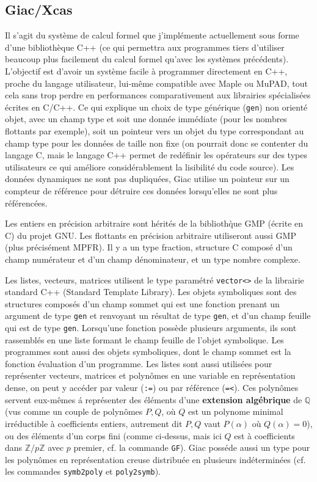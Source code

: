 \documentclass[a4paper,11pt]{book}
\begin{document}
\begin{giacjshere}
\subsection{Giac/Xcas}
Il s'agit du système de calcul formel que j'implémente actuellement sous 
forme d'une biblioth\`eque C++ (ce qui
permettra aux programmes tiers d'utiliser beaucoup plus facilement du 
calcul formel qu'avec les syst\`emes pr\'ec\'edents). L'objectif est 
d'avoir un syst\`eme facile \`a programmer directement en C++, proche 
du langage utilisateur, lui-m\^eme compatible avec Maple ou MuPAD, 
tout cela sans trop perdre en performances comparativement aux
librairies sp\'ecialis\'ees \'ecrites en C/C++. Ce qui explique un choix 
de type g\'en\'erique (\verb=gen=) non orient\'e objet, avec un champ type 
et soit une donn\'ee imm\'ediate (pour les nombres flottants par exemple), 
soit un pointeur vers un objet du type correspondant au champ type pour 
les donn\'ees de taille non fixe (on pourrait donc se
contenter du langage C, mais le langage C++ permet de red\'efinir 
les op\'erateurs sur des types utilisateurs ce qui
am\'eliore consid\'erablement la lisibilit\'e du code source). 
Les donn\'ees dynamiques ne sont pas dupliqu\'ees, Giac
utilise un pointeur sur un compteur de r\'ef\'erence pour d\'etruire 
ces donn\'ees lorsqu'elles ne sont plus r\'ef\'erenc\'ees.

Les entiers en pr\'ecision arbitraire sont h\'erit\'es de la biblioth\`que
GMP (\'ecrite en C) du projet GNU. Les flottants en pr\'ecision arbitraire
utiliseront aussi GMP (plus précisément MPFR).
Il y a un type fraction, structure C compos\'e d'un champ num\'erateur
et d'un champ d\'enominateur, et un type nombre complexe.

Les listes, vecteurs, matrices utilisent le type paramétré \verb|vector<>|
de la librairie standard C++ (Standard Template Library).
Les objets symboliques sont des structures compos\'es d'un champ sommet
qui est une fonction prenant un argument de type \verb|gen|
et renvoyant un r\'esultat
de type \verb|gen|, et d'un champ feuille qui est de type \verb|gen|.
Lorsqu'une fonction poss\`ede plusieurs arguments, ils sont rassembl\'es
en une liste formant le champ feuille de l'objet symbolique.
Les programmes sont aussi des objets symboliques, dont le champ
sommet est la fonction évaluation d'un programme.
Les listes sont aussi utilis\'ees pour repr\'esenter vecteurs, matrices
et polyn\^omes en une variable en repr\'esentation dense, on peut
y acc\'eder par valeur (\verb|:=|) ou par r\'ef\'erence
(\verb|=<|). Ces polyn\^omes servent eux-m\^emes \'a repr\'esenter
des \'el\'ements d'une 
{\bf extension alg\'ebrique}  de $\mathbb{Q}$ (vus comme
un couple de polyn\^omes $P,Q$, o\`u $Q$ est un polynome minimal
irr\'eductible \`a coefficients entiers, autrement dit $P,Q$ vaut $P(\alpha)$ 
o\`u $Q(\alpha)=0$),
ou des \'el\'ements d'un corps fini (comme ci-dessus, mais ici $Q$ est
\`a coefficients dans $\mathbb{Z}/p\mathbb{Z}$ avec $p$ premier, cf. la commande \verb|GF|).
Giac poss\'ede aussi un type pour les polyn\^omes
en repr\'esentation creuse distribu\'ee en plusieurs
ind\'etermin\'ees (cf. les commandes \verb|symb2poly| et \verb|poly2symb|).


\end{giacjshere}
\end{document}

